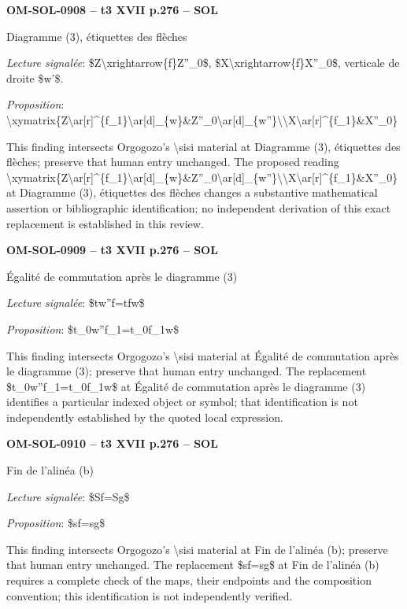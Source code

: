\par\noindent\textbf{OM-SOL-0908 -- t3 XVII p.276 -- SOL}\par
Diagramme (3), étiquettes des flèches\par
\emph{Lecture signalée}: \$Z\textbackslash{}xrightarrow\{f\}Z''\_0\$, \$X\textbackslash{}xrightarrow\{f\}X''\_0\$, verticale de droite \$w'\$.\par
\emph{Proposition}: \textbackslash{}xymatrix\{Z\textbackslash{}ar[r]\textasciicircum{}\{f\_1\}\textbackslash{}ar[d]\_\{w\}\&Z''\_0\textbackslash{}ar[d]\_\{w''\}\textbackslash{}\textbackslash{}X\textbackslash{}ar[r]\textasciicircum{}\{f\_1\}\&X''\_0\}\par
This finding intersects Orgogozo's \textbackslash{}sisi material at Diagramme (3), étiquettes des flèches; preserve that human entry unchanged. The proposed reading \textbackslash{}xymatrix\{Z\textbackslash{}ar[r]\textasciicircum{}\{f\_1\}\textbackslash{}ar[d]\_\{w\}\&Z''\_0\textbackslash{}ar[d]\_\{w''\}\textbackslash{}\textbackslash{}X\textbackslash{}ar[r]\textasciicircum{}\{f\_1\}\&X''\_0\} at Diagramme (3), étiquettes des flèches changes a substantive mathematical assertion or bibliographic identification; no independent derivation of this exact replacement is established in this review.\par
\par\noindent\textbf{OM-SOL-0909 -- t3 XVII p.276 -- SOL}\par
Égalité de commutation après le diagramme (3)\par
\emph{Lecture signalée}: \$tw''f=\allowbreak tfw\$\par
\emph{Proposition}: \$t\_0w''f\_1=\allowbreak t\_0f\_1w\$\par
This finding intersects Orgogozo's \textbackslash{}sisi material at Égalité de commutation après le diagramme (3); preserve that human entry unchanged. The replacement \$t\_0w''f\_1=\allowbreak t\_0f\_1w\$ at Égalité de commutation après le diagramme (3) identifies a particular indexed object or symbol; that identification is not independently established by the quoted local expression.\par
\par\noindent\textbf{OM-SOL-0910 -- t3 XVII p.276 -- SOL}\par
Fin de l'alinéa (b)\par
\emph{Lecture signalée}: \$Sf=\allowbreak Sg\$\par
\emph{Proposition}: \$sf=\allowbreak sg\$\par
This finding intersects Orgogozo's \textbackslash{}sisi material at Fin de l'alinéa (b); preserve that human entry unchanged. The replacement \$sf=\allowbreak sg\$ at Fin de l'alinéa (b) requires a complete check of the maps, their endpoints and the composition convention; this identification is not independently verified.\par

